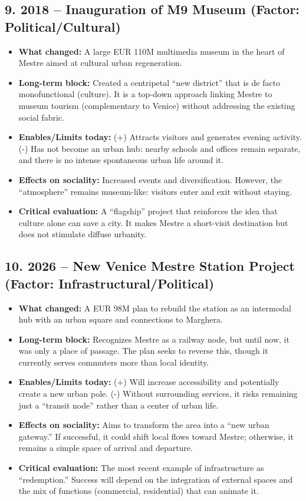 \documentclass[a4paper,11pt]{article}
\begin{document}
\subsection*{9. 2018 – Inauguration of M9 Museum (Factor: Political/Cultural)}
\begin{itemize}
    \item \textbf{What changed:} A large EUR 110M multimedia museum in the heart of Mestre aimed at cultural urban regeneration.
    \item \textbf{Long-term block:} Created a centripetal ``new district'' that is de facto monofunctional (culture). It is a top-down approach linking Mestre to museum tourism (complementary to Venice) without addressing the existing social fabric.
    \item \textbf{Enables/Limits today:} (+) Attracts visitors and generates evening activity. (-) Has not become an urban hub: nearby schools and offices remain separate, and there is no intense spontaneous urban life around it.
    \item \textbf{Effects on sociality:} Increased events and diversification. However, the ``atmosphere'' remains museum-like: visitors enter and exit without staying.
    \item \textbf{Critical evaluation:} A ``flagship'' project that reinforces the idea that culture alone can save a city. It makes Mestre a short-visit destination but does not stimulate diffuse urbanity.
\end{itemize}

\subsection*{10. 2026 – New Venice Mestre Station Project (Factor: Infrastructural/Political)}
\begin{itemize}
    \item \textbf{What changed:} A EUR 98M plan to rebuild the station as an intermodal hub with an urban square and connections to Marghera.
    \item \textbf{Long-term block:} Recognizes Mestre as a railway node, but until now, it was only a place of passage. The plan seeks to reverse this, though it currently serves commuters more than local identity.
    \item \textbf{Enables/Limits today:} (+) Will increase accessibility and potentially create a new urban pole. (-) Without surrounding services, it risks remaining just a ``transit node'' rather than a center of urban life.
    \item \textbf{Effects on sociality:} Aims to transform the area into a ``new urban gateway.'' If successful, it could shift local flows toward Mestre; otherwise, it remains a simple space of arrival and departure.
    \item \textbf{Critical evaluation:} The most recent example of infrastructure as ``redemption.'' Success will depend on the integration of external spaces and the mix of functions (commercial, residential) that can animate it.
\end{itemize}
\end{document}
